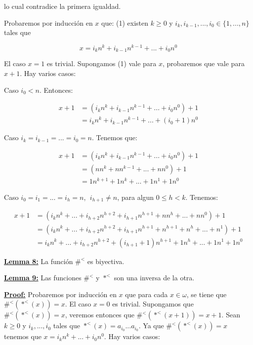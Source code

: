     \par lo cual contradice la primera igualdad.

    \par Probaremos por inducción en $x$ que: (1) existen $k \geq 0$ y $i_{k}, i_{k - 1}, ..., i_{0} \in \{1, ..., n\}$
    tales que

    \[
      x = i_{k} n^{k} + i_{k - 1} n^{k - 1} + ... + i_{0} n^{0}
    \]

    El caso $x=1$ es trivial. Supongamos (1) vale para $x$, probaremos que vale para $x + 1$. Hay varios casos:

    Caso $i_{0} < n$. Entonces:

    \begin{eqnarray}
      \nonumber x+1 & =\left( i_{k}n^{k}+i_{k-1}n^{k-1}+...+i_{0}n^{0}\right) +1 \\
      \nonumber & =i_{k}n^{k}+i_{k-1}n^{k-1}+...+(i_{0}+1)n^{0}
    \end{eqnarray}

    Caso $i_{k}=i_{k-1}=...=i_{0}=n$. Tenemos que:

    \begin{eqnarray}
      \nonumber x+1 & =\left( i_{k}n^{k}+i_{k-1}n^{k-1}+...+i_{0}n^{0}\right) +1 \\
      \nonumber & =\left( nn^{k}+nn^{k-1}+...+nn^{0}\right) +1 \\
      \nonumber & =1n^{k+1}+1n^{k}+...+1n^{1}+1n^{0}
    \end{eqnarray}

    Caso $i_{0}=i_{1}=...=i_{h}=n$, $\;i_{h+1}\not=n$, para algun $ 0\leq h< k$. Tenemos:

    \begin{eqnarray}
      \nonumber x+1 & =\left( i_{k}n^{k}+...+i_{h+2}n^{h+2}+i_{h+1}n^{h+1}+nn^{h}+...+nn^{0}\right) +1 \\
      \nonumber & =\left( i_{k}n^{k}+...+i_{h+2}n^{h+2}+i_{h+1}n^{h+1}+n^{h+1}+n^{h}+...+n^{1}\right) +1 \\
      \nonumber & =i_{k}n^{k}+...+i_{h+2}n^{h+2}+(i_{h+1}+1)n^{h+1}+1n^{h}+...+1n^{1}+1n^{0}
    \end{eqnarray}

  \QED


  \textbf{\underline{Lemma 8:}} La función $\#^{<}$ es biyectiva.

  \textbf{\underline{Lemma 9:}} Las funciones $\#^{<}$ y $\ast^{<}$ son una inversa de la otra.

  \textbf{\underline{Proof:}} Probaremos por inducción en $x$ que para cada $x \in \omega$, se tiene que
    $\#^{<}(\ast^{<}(x)) = x$. El caso $x = 0$ es trivial. Supongamos que $\#^{<}(\ast^{<}(x)) = x$, veremos entonces
    que $\#^{<}(\ast^{<}(x + 1)) = x + 1$. Sean $k \geq 0$ y $i_{k}, ..., i_{0}$ tales que $\ast^{<}(x) = a_{i_{0}} ...
    a_{i_{0}}$. Ya que $\#^{<}(\ast^{<}(x)) = x$ tenemos que $x = i_{k} n^{k} + ... + i_{0} n^{0}$. Hay varios casos:

